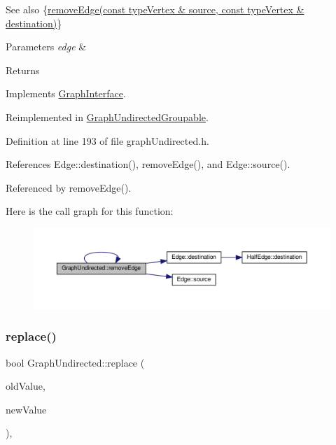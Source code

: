 \begin{DoxySeeAlso}{See also}
\{\hyperlink{classGraphUndirected_af4a40541132a66c9b688a20958057751}{remove\+Edge(const type\+Vertex \& source, const type\+Vertex \& destination)}\} 
\end{DoxySeeAlso}

\begin{DoxyParams}{Parameters}
{\em edge} & \\
\hline
\end{DoxyParams}
\begin{DoxyReturn}{Returns}

\end{DoxyReturn}


Implements \hyperlink{classGraphInterface_a954e2d16f474cce832f02d4495df3092}{Graph\+Interface}.



Reimplemented in \hyperlink{classGraphUndirectedGroupable_a88e02e4e05f304b289558922f1cb6aa1}{Graph\+Undirected\+Groupable}.



Definition at line 193 of file graph\+Undirected.\+h.



References Edge\+::destination(), remove\+Edge(), and Edge\+::source().



Referenced by remove\+Edge().

Here is the call graph for this function\+:
\nopagebreak
\begin{figure}[H]
\begin{center}
\leavevmode
\includegraphics[width=350pt]{classGraphUndirected_ad39275e7a8f7a39734916b8c5400a1d6_cgraph}
\end{center}
\end{figure}
\mbox{\label{classGraphUndirected_aee3bc279ffe39f8efb7dd60865279474}} 
\subsubsection{\texorpdfstring{replace()}{replace()}}
{\footnotesize\ttfamily bool Graph\+Undirected\+::replace (\begin{DoxyParamCaption}\item[{const \hyperlink{edge_8h_a5fbd20c46956d479cb10afc9855223f6}{type\+Vertex} \&}]{old\+Value,  }\item[{const \hyperlink{edge_8h_a5fbd20c46956d479cb10afc9855223f6}{type\+Vertex} \&}]{new\+Value }\end{DoxyParamCaption})\hspace{0.3cm}{\ttfamily [inline]}, {\ttfamily [virtual]}}

